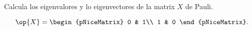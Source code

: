 \documentclass[./../main.tex]{subfiles}
\begin{document}
    \section{}

    Calcula los eigenvalores y lo eigenvectores de la matrix \(X\) de Pauli.

    \begin{equation*}
        \op{X} = \begin{pNiceMatrix}
            0 & 1\\
            1 & 0
        \end{pNiceMatrix}.
    \end{equation*}
\end{document}
